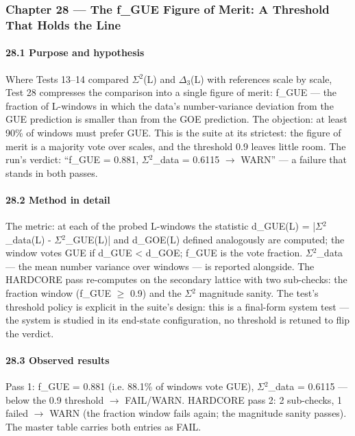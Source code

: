 \documentclass[10pt]{article}
\begin{document}
\subsubsection{Chapter 28 --- The f\_GUE Figure of Merit: A Threshold That Holds the Line}

\paragraph{28.1 Purpose and hypothesis}

Where Tests 13--14 compared $\Sigma$$^2$(L) and $\Delta$$_3$(L) with references scale by scale, Test 28 compresses the comparison into a single figure of merit: f\_GUE --- the fraction of L-windows in which the data's number-variance deviation from the GUE prediction is smaller than from the GOE prediction. The objection: at least 90\% of windows must prefer GUE. This is the suite at its strictest: the figure of merit is a majority vote over scales, and the threshold 0.9 leaves little room. The run's verdict: ``f\_GUE = 0.881, $\Sigma$$^2$\_data = 0.6115 $\rightarrow$ WARN'' --- a failure that stands in both passes.

\paragraph{28.2 Method in detail}

The metric: at each of the probed L-windows the statistic d\_GUE(L) = |$\Sigma$$^2$\_data(L) - $\Sigma$$^2$\_GUE(L)| and d\_GOE(L) defined analogously are computed; the window votes GUE if d\_GUE < d\_GOE; f\_GUE is the vote fraction. $\Sigma$$^2$\_data --- the mean number variance over windows --- is reported alongside. The HARDCORE pass re-computes on the secondary lattice with two sub-checks: the fraction window (f\_GUE $\ge$ 0.9) and the $\Sigma$$^2$ magnitude sanity. The test's threshold policy is explicit in the suite's design: this is a final-form system test --- the system is studied in its end-state configuration, no threshold is retuned to flip the verdict.

\paragraph{28.3 Observed results}

Pass 1: f\_GUE = 0.881 (i.e. 88.1\% of windows vote GUE), $\Sigma$$^2$\_data = 0.6115 --- below the 0.9 threshold $\rightarrow$ FAIL/WARN. HARDCORE pass 2: 2 sub-checks, 1 failed $\rightarrow$ WARN (the fraction window fails again; the magnitude sanity passes). The master table carries both entries as FAIL.
\end{document}
